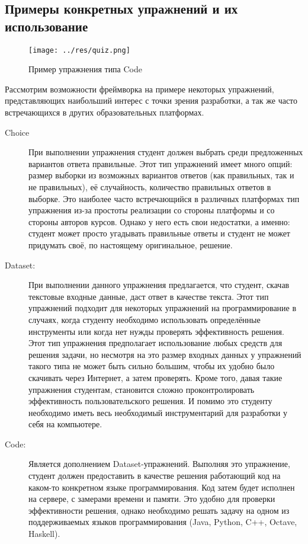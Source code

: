 \documentclass{matmex-diploma-custom}
\begin{document}
\subsection{Примеры конкретных упражнений и их использование}
\begin{figure}[h]
  \texttt{[image: ../res/quiz.png]}
  \caption{Пример упражнения типа Code}
  \label{fig:fig2}
\end{figure}

Рассмотрим возможности фреймворка на примере некоторых упражнений,
представляющих наибольший интерес с точки зрения разработки, а так же
часто встречающихся в других образовательных платформах.

\begin{description}
\item[Choice] При выполнении упражнения студент должен выбрать среди
  предложенных вариантов ответа правильные. Этот тип упражнений имеет
  много опций: размер выборки из возможных вариантов ответов (как
  правильных, так и не правильных), её случайность, количество
  правильных ответов в выборке. Это наиболее часто встречающийся в
  различных платформах тип упражнения из-за простоты реализации со
  стороны платформы и со стороны авторов курсов. Однако у него есть
  свои недостатки, а именно: студент может просто угадывать правильные
  ответы и студент не может придумать своё, по настоящему
  оригинальное, решение.

\item[Dataset:] При выполнении данного упражнения предлагается, что
  студент, скачав текстовые входные данные, даст ответ в качестве
  текста. Этот тип упражнений подходит для некоторых упражнений на
  программирование в случаях, когда студенту необходимо использовать
  определённые инструменты или когда нет нужды проверять эффективность
  решения. Этот тип упражнения предполагает использование любых
  средств для решения задачи, но несмотря на это размер входных данных
  у упражнений такого типа не может быть сильно большим, чтобы их
  удобно было скачивать через Интернет, а затем проверять. Кроме того,
  давая такие упражнения студентам, становится сложно
  проконтролировать эффективность пользовательского решения. И помимо
  это студенту необходимо иметь весь необходимый инструментарий для
  разработки у себя на компьютере.

\item[Code:] Является дополнением Dataset-упражнений. Выполняя это
  упражнение, студент должен предоставить в качестве решения
  работающий код на каком-то конкретном языке программирования. Код
  затем будет исполнен на сервере, с замерами времени и памяти. Это
  удобно для проверки эффективности решения, однако необходимо решать
  задачу на одном из поддерживаемых языков программирования (Java,
  Python, C++, Octave, Haskell).

\end{description}
\end{document}
